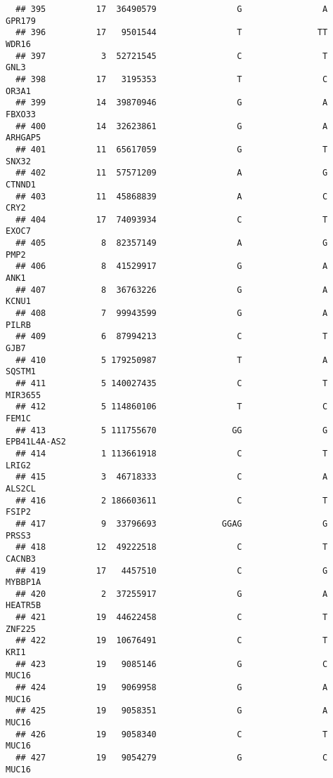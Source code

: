\documentclass[12pt,twoside]{reedthesis}
\theoremstyle{definition}
\theoremstyle{definition}
\theoremstyle{remark}
\begin{document}
\begin{verbatim}
  ## 395          17  36490579                G                A         GPR179
  ## 396          17   9501544                T               TT          WDR16
  ## 397           3  52721545                C                T           GNL3
  ## 398          17   3195353                T                C          OR3A1
  ## 399          14  39870946                G                A         FBXO33
  ## 400          14  32623861                G                A        ARHGAP5
  ## 401          11  65617059                G                T          SNX32
  ## 402          11  57571209                A                G         CTNND1
  ## 403          11  45868839                A                C           CRY2
  ## 404          17  74093934                C                T          EXOC7
  ## 405           8  82357149                A                G           PMP2
  ## 406           8  41529917                G                A           ANK1
  ## 407           8  36763226                G                A          KCNU1
  ## 408           7  99943599                G                A          PILRB
  ## 409           6  87994213                C                T           GJB7
  ## 410           5 179250987                T                A         SQSTM1
  ## 411           5 140027435                C                T        MIR3655
  ## 412           5 114860106                T                C          FEM1C
  ## 413           5 111755670               GG                G   EPB41L4A-AS2
  ## 414           1 113661918                C                T          LRIG2
  ## 415           3  46718333                C                A         ALS2CL
  ## 416           2 186603611                C                T          FSIP2
  ## 417           9  33796693             GGAG                G          PRSS3
  ## 418          12  49222518                C                T         CACNB3
  ## 419          17   4457510                C                G        MYBBP1A
  ## 420           2  37255917                G                A        HEATR5B
  ## 421          19  44622458                C                T         ZNF225
  ## 422          19  10676491                C                T           KRI1
  ## 423          19   9085146                G                C          MUC16
  ## 424          19   9069958                G                A          MUC16
  ## 425          19   9058351                G                A          MUC16
  ## 426          19   9058340                C                T          MUC16
  ## 427          19   9054279                G                C          MUC16

\end{verbatim}
\end{document}
